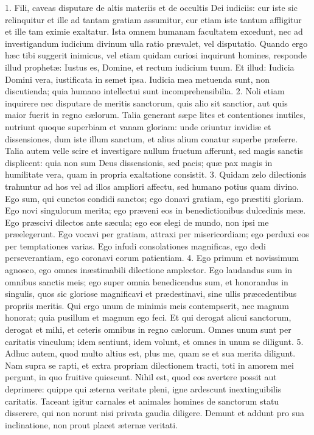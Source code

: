\documentclass[twoside]{article}
\begin{document}
1. Fili, caveas disputare de altis materiis et de occultis Dei iudiciis: cur iste sic relinquitur et ille ad tantam gratiam assumitur, cur etiam iste tantum affligitur et ille tam eximie exaltatur. Ista omnem humanam facultatem excedunt, nec ad investigandum iudicium divinum ulla ratio prævalet, vel disputatio. Quando ergo hæc tibi suggerit inimicus, vel etiam quidam curiosi inquirunt homines, responde illud prophetæ: Iustus es, Domine, et rectum iudicium tuum. Et illud: Iudicia Domini vera, iustificata in semet ipsa. Iudicia mea metuenda sunt, non discutienda; quia humano intellectui sunt incomprehensibilia.
2. Noli etiam inquirere nec disputare de meritis sanctorum, quis alio sit sanctior, aut quis maior fuerit in regno cælorum. Talia generant sæpe lites et contentiones inutiles, nutriunt quoque superbiam et vanam gloriam: unde oriuntur invidiæ et dissensiones, dum iste illum sanctum, et alius alium conatur superbe præferre. Talia autem velle scire et investigare nullum fructum afferunt, sed magis sanctis displicent: quia non sum Deus dissensionis, sed pacis; quæ pax magis in humilitate vera, quam in propria exaltatione consistit.
3. Quidam zelo dilectionis trahuntur ad hos vel ad illos ampliori affectu, sed humano potius quam divino. Ego sum, qui cunctos condidi sanctos; ego donavi gratiam, ego præstiti gloriam. Ego novi singulorum merita; ego præveni eos in benedictionibus dulcedinis meæ. Ego præscivi dilectos ante sæcula; ego eos elegi de mundo, non ipsi me præelegerunt. Ego vocavi per gratiam, attraxi per misericordiam; ego perduxi eos per temptationes varias. Ego infudi consolationes magnificas, ego dedi perseverantiam, ego coronavi eorum patientiam.
4. Ego primum et novissimum agnosco, ego omnes inæstimabili dilectione amplector. Ego laudandus sum in omnibus sanctis meis; ego super omnia benedicendus sum, et honorandus in singulis, quos sic gloriose magnificavi et prædestinavi, sine ullis præcedentibus propriis meritis. Qui ergo unum de minimis meis contempserit, nec magnum honorat; quia pusillum et magnum ego feci. Et qui derogat alicui sanctorum, derogat et mihi, et ceteris omnibus in regno cælorum. Omnes unum sunt per caritatis vinculum; idem sentiunt, idem volunt, et omnes in unum se diligunt.
5. Adhuc autem, quod multo altius est, plus me, quam se et sua merita diligunt. Nam supra se rapti, et extra propriam dilectionem tracti, toti in amorem mei pergunt, in quo fruitive quiescunt. Nihil est, quod eos avertere possit aut deprimere: quippe qui æterna veritate pleni, igne ardescunt inextinguibilis caritatis. Taceant igitur carnales et animales homines de sanctorum statu disserere, qui non norunt nisi privata gaudia diligere. Demunt et addunt pro sua inclinatione, non prout placet æternæ veritati.
\end{document}
